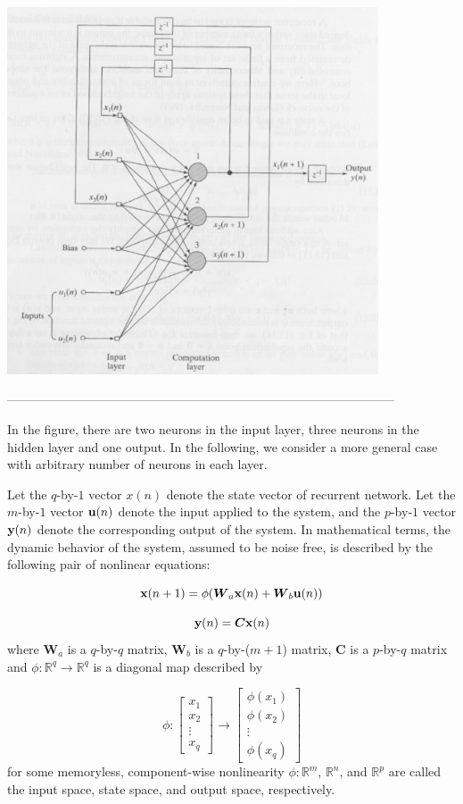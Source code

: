 \documentclass[10pt]{article}
\newcommand{\vect}[1]{{\bf{#1}}}
\newcommand{\matr}[1]{\boldsymbol{#1}}
\begin{document}
\begin{enumerate}
\hspace{2cm}\includegraphics[width=11cm]{l12k9.eps}

---------------------------------------------------------------------------------------------

In the figure, there are two neurons in the input layer, three neurons in the hidden layer and one
output. In the following, we consider a more general case with arbitrary number of neurons in each layer.

Let the $q$-by-$1$ vector $x(n)$ denote the state vector of recurrent network. Let the $m$-by-$1$ vector $\vect{u}(n)$ 
denote the input
applied to the system, and the $p$-by-$1$ vector $\vect{y}(n)$ denote the
corresponding output of the system. In mathematical terms, the dynamic
behavior of the system, assumed to be noise free, is described by the
following pair of nonlinear equations:

\[
\vect{x}(n+1) = \phi (\matr{W}_a \vect{x}(n) + \matr{W}_b \vect{u}(n))
\]

\[
\vect{y}(n) = \matr{C} \vect{x}(n)
\]
where $\matr{W}_a$ is a $q$-by-$q$ matrix, $\matr{W}_b$ is a $q$-by-($m+1$) matrix, $\matr{C}$ is a
$p$-by-$q$ matrix and $\phi: \mathbb{R}^q \rightarrow \mathbb{R}^q$ is a
diagonal map described by

\[
\phi:
\left[\begin{array}{c}
x_1 \\
x_2 \\
\vdots \\
x_q
\end{array}\right]
\rightarrow
\left[\begin{array}{c}
\phi(x_1) \\
\phi(x_2) \\
\vdots \\
\phi(x_q)
\end{array}\right]
\]
for some memoryless, component-wise nonlinearity $\phi: \mathbb{R}^m$,
$\mathbb{R}^n$, and $\mathbb{R}^p$ are called the input space, state
space, and output space, respectively.


\end{enumerate}
\end{document}
